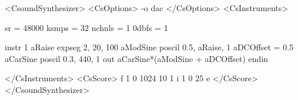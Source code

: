 <CsoundSynthesizer>
<CsOptions>
-o dac
</CsOptions>
<CsInstruments>

sr = 48000
ksmps = 32
nchnls = 1
0dbfs = 1

instr 1
aRaise expseg 2, 20, 100
aModSine poscil 0.5, aRaise, 1
aDCOffset = 0.5  
aCarSine poscil 0.3, 440, 1
out aCarSine*(aModSine + aDCOffset)
endin

</CsInstruments>
<CsScore>
f 1 0 1024 10 1
i 1 0 25
e
</CsScore>
</CsoundSynthesizer>